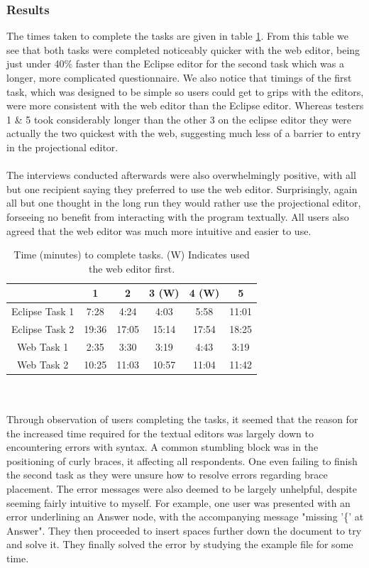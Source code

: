 \documentclass{article}
\begin{document}
\subsubsection{Results}
The times taken to complete the tasks are given in table \ref{Tab:questionnaireResults}. From this table we see that both tasks were completed noticeably quicker with the web editor, being just under 40\% faster than the Eclipse editor for the second task which was a longer, more complicated questionnaire. We also notice that timings of the first task, which was designed to be simple so users could get to grips with the editors, were more consistent with the web editor than the Eclipse editor. Whereas testers 1 \& 5 took considerably longer than the other 3 on the eclipse editor they were actually the two quickest with the web, suggesting much less of a barrier to entry in the projectional editor.  
\\
\\
The interviews conducted afterwards were also overwhelmingly positive, with all but one recipient saying they preferred to use the web editor. Surprisingly, again all but one thought in the long run they would rather use the projectional editor, forseeing no benefit from interacting with the program textually. All users also agreed that the web editor was much more intuitive and easier to use.
\begin{table}[ht]
\centering
	\begin{tabular}{| c | c | c | c | c | c |}
	\hline
	& 1  & 2 & 3 (W) & 4 (W) & 5 \\
	\hline 
	Eclipse Task 1 & 7:28 & 4:24 & 4:03 & 5:58 & 11:01 \\
	Eclipse Task 2 & 19:36 & 17:05 & 15:14 & 17:54 & 18:25 \\
	Web Task 1 & 2:35 & 3:30 & 3:19 & 4:43 & 3:19 \\
	Web Task 2 & 10:25 & 11:03 & 10:57 & 11:04 & 11:42 \\
	\hline
	\end{tabular}
	\caption{Time (minutes) to complete tasks. (W) Indicates used the web editor first.}
	\label{Tab:questionnaireResults}
\end{table}
\\
\\
Through observation of users completing the tasks, it seemed that the reason for the increased time required for the textual editors was largely down to encountering errors with syntax. A common stumbling block was in the positioning of curly braces, it affecting all respondents. One even failing to finish the second task as they were unsure how to resolve errors regarding brace placement. The error messages were also deemed to be largely unhelpful, despite seeming fairly intuitive to myself. For example, one user was presented with an error underlining an Answer node, with the accompanying message "missing '\{' at Answer". They then proceeded to insert spaces further down the document to try and solve it. They finally solved the error by studying the example file for some time. 
\end{document}
